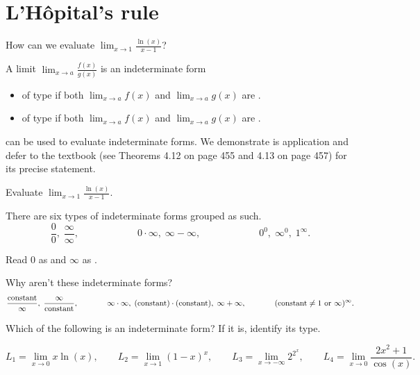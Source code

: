 \documentclass[../main.tex]{subfiles}
\begin{document}
 \section{L'H\^opital's rule}
  How can we evaluate \(\lim_{x \to 1} \frac{\ln(x)}{x - 1}\)?

  A limit \(\lim_{x \to a} \frac{f(x)}{g(x)}\) is an indeterminate form 
  \begin{itemize}
    \item of type \underline{\hspace{1in}} if both \(\lim_{x \to a} f(x)\) and \(\lim_{x \to a} g(x)\) are \underline{\hspace{1in}}.
    \item of type \underline{\hspace{1in}} if both \(\lim_{x \to a} f(x)\) and \(\lim_{x \to a} g(x)\) are \underline{\hspace{1in}}.
  \end{itemize}
   can be used to evaluate indeterminate forms. We demonstrate is application and defer to the textbook (see Theorems 4.12 on page 455 and 4.13 on page 457) for its precise statement.
  
  \begin{example}
    Evaluate \(\lim_{x \to 1} \frac{\ln(x)}{x - 1}\).
  \end{example}

  There are six types of indeterminate forms grouped as such.
  \[
    \frac{0}{0},\; \frac{\infty}{\infty}, \hspace{1in} 0 \cdot \infty,\; \infty - \infty, \hspace{1in} 0^{0}, \; \infty^{0}, \; 1^{\infty}.
  \]

  Read \(0\) as \underline{\hspace{3in}} and \(\infty\) as \underline{\hspace{3in}}. 

  Why aren't these indeterminate forms?
  \[
    \frac{\text{constant}}{\infty},\; \frac{\infty}{\text{constant}}, \hspace{0.5in} \infty \cdot \infty,\; (\text{constant}) \cdot (\text{constant}),\; \infty + \infty, \hspace{0.5in} (\text{constant} \ne 1 \text{ or } \infty)^{\infty}.
  \]
  
  \begin{example}
    Which of the following is an indeterminate form? If it is, identify its type. 

    \[
      L_{1} = \lim_{x \to 0} x \ln(x),
      \qquad
      L_{2} = \lim_{x \to 1} (1-x)^{x},
      \qquad
      L_{3} = \lim_{x \to -\infty} 2^{2^{x}},
      \qquad
      L_{4} = \lim_{x \to 0} \frac{2x^{2}+1}{\cos(x)}.
    \]
  \end{example}
  \clearpage
\end{document}
